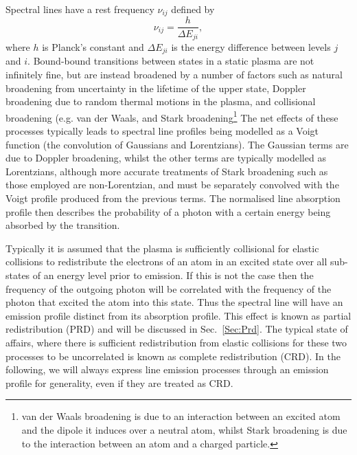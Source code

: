 Spectral lines have a rest frequency $\nu_{ij}$  defined by
\begin{equation}
    \nu_{ij} = \frac{h}{\Delta E_{ji}},
\end{equation}
where $h$ is Planck's constant and $\Delta E_{ji}$ is the energy difference between levels $j$ and $i$.
Bound-bound transitions between states in a static plasma are not infinitely fine, but are instead broadened by a number of factors such as natural broadening from uncertainty in the lifetime of the upper state, Doppler broadening due to random thermal motions in the plasma, and collisional broadening (e.g. van der Waals, and Stark broadening\footnote{van der Waals broadening is due to an interaction between an excited atom and the dipole it induces over a neutral atom, whilst Stark broadening is due to the interaction between an atom and a charged particle.} %
The net effects of these processes typically leads to spectral line profiles being modelled as a Voigt function (the convolution of Gaussians and Lorentzians).
The Gaussian terms are due to Doppler broadening, whilst the other terms are typically modelled as Lorentzians, although more accurate treatments of Stark broadening such as those employed \citet{Kowalski2017} are non-Lorentzian, and must be separately convolved with the Voigt profile produced from the previous terms.
The normalised line absorption profile then describes the probability of a photon with a certain energy being absorbed by the transition.

Typically it is assumed that the plasma is sufficiently collisional for elastic collisions to redistribute the electrons of an atom in an excited state over all sub-states of an energy level prior to emission.
If this is not the case then the frequency of the outgoing photon will be correlated with the frequency of the photon that excited the atom into this state.
Thus the spectral line will have an emission profile distinct from its absorption profile.
This effect is known as partial redistribution (PRD) and will be discussed in Sec.~\ref{Sec:Prd}.
The typical state of affairs, where there is sufficient redistribution from elastic collisions for these two processes to be uncorrelated is known as complete redistribution (CRD).
In the following, we will always express line emission processes through an emission profile for generality, even if they are treated as CRD.

